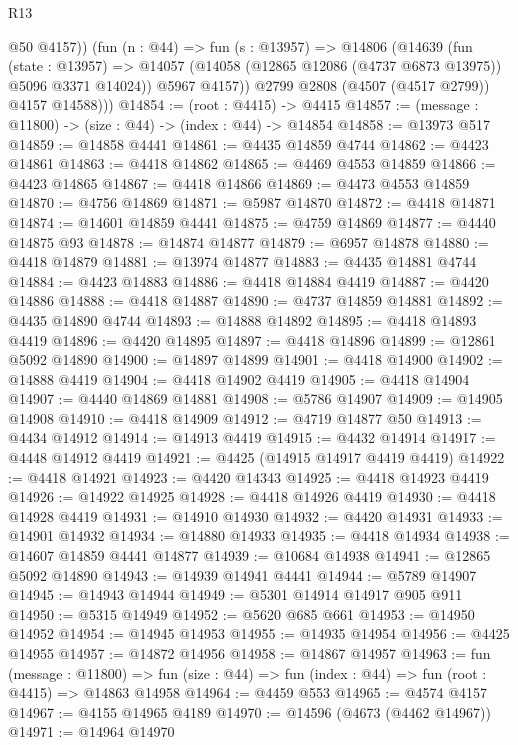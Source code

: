 \begin{lexlean}{R13}
\begin{coremodule}
              @50
              @4157))
          (fun (n : @44) =>
          fun (s : @13957) =>
          @14806
            (@14639
              (fun (state : @13957) =>
              @14057 (@14058 (@12865 @12086 (@4737 @6873 @13975)) @5096 @3371 @14024))
              @5967
              @4157))
          @2799
          @2808
          (@4507 (@4517 @2799))
          @4157
          @14588)))
@14854 := (root : @4415) -> @4415
@14857 := (message : @11800) -> (size : @44) -> (index : @44) -> @14854
@14858 := @13973 @517
@14859 := @14858 @4441
@14861 := @4435 @14859 @4744
@14862 := @4423 @14861
@14863 := @4418 @14862
@14865 := @4469 @4553 @14859
@14866 := @4423 @14865
@14867 := @4418 @14866
@14869 := @4473 @4553 @14859
@14870 := @4756 @14869
@14871 := @5987 @14870
@14872 := @4418 @14871
@14874 := @14601 @14859 @4441
@14875 := @4759 @14869
@14877 := @4440 @14875 @93
@14878 := @14874 @14877
@14879 := @6957 @14878
@14880 := @4418 @14879
@14881 := @13974 @14877
@14883 := @4435 @14881 @4744
@14884 := @4423 @14883
@14886 := @4418 @14884 @4419
@14887 := @4420 @14886
@14888 := @4418 @14887
@14890 := @4737 @14859 @14881
@14892 := @4435 @14890 @4744
@14893 := @14888 @14892
@14895 := @4418 @14893 @4419
@14896 := @4420 @14895
@14897 := @4418 @14896
@14899 := @12861 @5092 @14890
@14900 := @14897 @14899
@14901 := @4418 @14900
@14902 := @14888 @4419
@14904 := @4418 @14902 @4419
@14905 := @4418 @14904
@14907 := @4440 @14869 @14881
@14908 := @5786 @14907
@14909 := @14905 @14908
@14910 := @4418 @14909
@14912 := @4719 @14877 @50
@14913 := @4434 @14912
@14914 := @14913 @4419
@14915 := @4432 @14914
@14917 := @4448 @14912 @4419
@14921 := @4425 (@14915 @14917 @4419 @4419)
@14922 := @4418 @14921
@14923 := @4420 @14343
@14925 := @4418 @14923 @4419
@14926 := @14922 @14925
@14928 := @4418 @14926 @4419
@14930 := @4418 @14928 @4419
@14931 := @14910 @14930
@14932 := @4420 @14931
@14933 := @14901 @14932
@14934 := @14880 @14933
@14935 := @4418 @14934
@14938 := @14607 @14859 @4441 @14877
@14939 := @10684 @14938
@14941 := @12865 @5092 @14890
@14943 := @14939 @14941 @4441
@14944 := @5789 @14907
@14945 := @14943 @14944
@14949 := @5301 @14914 @14917 @905 @911
@14950 := @5315 @14949
@14952 := @5620 @685 @661
@14953 := @14950 @14952
@14954 := @14945 @14953
@14955 := @14935 @14954
@14956 := @4425 @14955
@14957 := @14872 @14956
@14958 := @14867 @14957
@14963 := fun (message : @11800) =>
  fun (size : @44) => fun (index : @44) => fun (root : @4415) => @14863 @14958
@14964 := @4459 @553
@14965 := @4574 @4157
@14967 := @4155 @14965 @4189
@14970 := @14596 (@4673 (@4462 @14967))
@14971 := @14964 @14970

\end{coremodule}
\end{lexlean}
